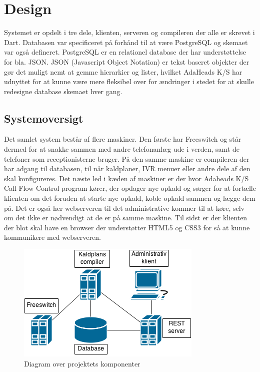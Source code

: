 \chapter{Design}
Systemet er opdelt i tre dele, klienten, serveren og compileren der alle er skrevet i Dart. Databasen var specificeret på forhånd til at være PostgreSQL og skemaet var også defineret. PostgreSQL er en relationel database der har understøttelse for bla. JSON.
JSON (Javascript Object Notation) er tekst baseret objekter der gør det muligt nemt at gemme hierarkier og lister, hvilket AdaHeads K/S har udnyttet for at kunne være mere fleksibel over for ændringer i stedet for at skulle redesigne database skemaet hver gang.


\section{Systemoversigt}
\label{sec:adminSystemoversigt}
Det samlet system består af flere maskiner. Den første har Freeswitch og står dermed for at snakke sammen med andre telefonanlæg ude i verden, samt de telefoner som receptionisterne bruger. På den samme maskine er compileren der har adgang til databasen, til når kaldplaner, IVR menuer eller andre dele af den skal konfigureres. Det næste led i kæden af maskiner er der hvor Adaheads K/S Call-Flow-Control program kører, der opdager nye opkald og sørger for at fortælle klienten om det foruden at starte nye opkald, koble opkald sammen og lægge dem på. Det er også her webserveren til det administrative kommer til at køre, selv om det ikke er nødvendigt at de er på samme maskine. Til sidst er der klienten der blot skal have en browser der understøtter HTML5 og CSS3 for så at kunne kommunikere med webserveren.

\begin{figure}[ht!]
\centering
\includegraphics[scale=0.8]{images/systemdiagram.png}
\caption{Diagram over projektets komponenter}
\label{fig:systemdiagram}
\end{figure}


